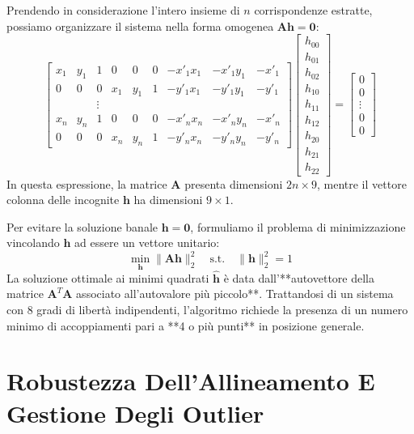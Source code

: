 ﻿\documentclass[11pt, a4paper]{article}
\begin{document}
Prendendo in considerazione l'intero insieme di $n$ corrispondenze estratte, possiamo organizzare il sistema nella forma omogenea $\bm{A}\bm{h} = \bm{0}$:
\[
\begin{bmatrix}
x_1 & y_1 & 1 & 0 & 0 & 0 & -x'_1 x_1 & -x'_1 y_1 & -x'_1 \\
0 & 0 & 0 & x_1 & y_1 & 1 & -y'_1 x_1 & -y'_1 y_1 & -y'_1 \\
& & \vdots & & & & & & \\
x_n & y_n & 1 & 0 & 0 & 0 & -x'_n x_n & -x'_n y_n & -x'_n \\
0 & 0 & 0 & x_n & y_n & 1 & -y'_n x_n & -y'_n y_n & -y'_n
\end{bmatrix}
\begin{bmatrix}
h_{00} \\ h_{01} \\ h_{02} \\ h_{10} \\ h_{11} \\ h_{12} \\ h_{20} \\ h_{21} \\ h_{22}
\end{bmatrix}
=
\begin{bmatrix}
0 \\ 0 \\ \vdots \\ 0 \\ 0
\end{bmatrix}
\]
In questa espressione, la matrice $\bm{A}$ presenta dimensioni $2n \times 9$, mentre il vettore colonna delle incognite $\bm{h}$ ha dimensioni $9 \times 1$.

Per evitare la soluzione banale $\bm{h} = \bm{0}$, formuliamo il problema di minimizzazione vincolando $\bm{h}$ ad essere un vettore unitario:
\[
\min_{\bm{h}} \lVert\bm{A}\bm{h}\rVert^2_2 \quad \text{s.t.} \quad \lVert\bm{h}\rVert^2_2 = 1
\]
La soluzione ottimale ai minimi quadrati $\hat{\bm{h}}$ è data dall'**autovettore della matrice $\bm{A}^T\bm{A}$ associato all'autovalore più piccolo**. Trattandosi di un sistema con $8$ gradi di libertà indipendenti, l'algoritmo richiede la presenza di un numero minimo di accoppiamenti pari a **4 o più punti** in posizione generale.

\newpage

\section{Robustezza Dell'Allineamento E Gestione Degli Outlier}
\end{document}
